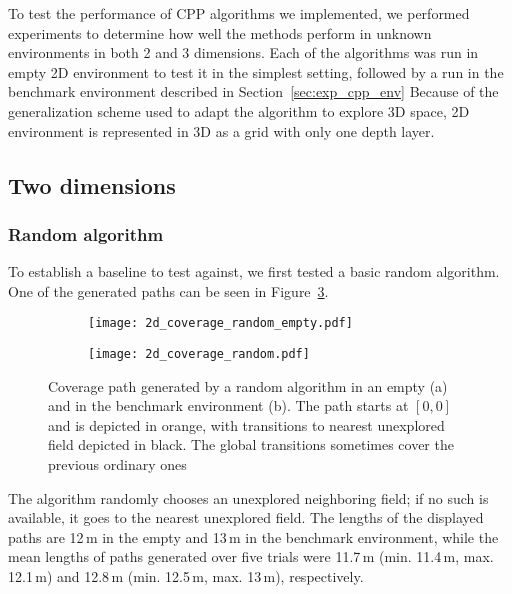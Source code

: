 \documentclass[buriama8_dp.tex]{subfiles}
\begin{document}
To test the performance of CPP algorithms we implemented, we performed experiments to determine how well the methods perform in unknown environments in both 2 and 3 dimensions. Each of the algorithms was run in empty 2D environment to test it in the simplest setting, followed by a run in the benchmark environment described in Section~\ref{sec:exp_cpp_env} Because of the generalization scheme used to adapt the algorithm to explore 3D space, 2D environment is represented in 3D as a grid with only one depth layer.

\subsection{Two dimensions}
\label{subsec:2d_sim}

\subsubsection{Random algorithm}
To establish a baseline to test against, we first tested a basic random algorithm. One of the generated paths can be seen in Figure~\ref{fig:rand_2d_coverage}.

\begin{figure}[htp]
  \centering
  \begin{subfigure}[t]{0.49\textwidth}
    \texttt{[image: 2d\_coverage\_random\_empty.pdf]}
    \caption{}
    \label{fig:rand_2d_empty}
  \end{subfigure}
  \begin{subfigure}[t]{0.49\textwidth}
    \texttt{[image: 2d\_coverage\_random.pdf]}
    \caption{}
    \label{fig:rand_2d_env}
  \end{subfigure}
  
  \caption[Coverage path -- random algorithm in 2D]{Coverage path generated by a random algorithm in an empty (a) and in the benchmark environment (b). The path starts at \([0,0]\) and is depicted in orange, with transitions to nearest unexplored field depicted in black. The global transitions sometimes cover the previous ordinary ones}
  \label{fig:rand_2d_coverage}
\end{figure}

The algorithm randomly chooses an unexplored neighboring field; if no such is available, it goes to the nearest unexplored field. The lengths of the displayed paths are 12\,m in the empty and 13\,m in the benchmark environment, while the mean lengths of paths generated over five trials were 11.7\,m (min. 11.4\,m, max. 12.1\,m) and 12.8\,m (min. 12.5\,m, max. 13\,m), respectively.
\end{document}
